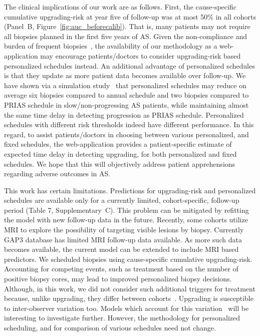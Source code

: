 The clinical implications of our work are as follows. First, the cause-specific cumulative upgrading-risk at year five of follow-up was at most 50\% in all cohorts (Panel~B, Figure~\ref{fig:auc_beforecalib}). That is, many patients may not require all biopsies planned in the first five years of AS. Given the non-compliance and burden of frequent biopsies~\citep{bokhorst2015compliance}, the availability of our methodology as a web-application may encourage patients/doctors to consider upgrading-risk based personalized schedules instead. An additional advantage of personalized schedules is that they update as more patient data becomes available over follow-up. We have shown via a simulation study~\citep{tomer2019personalized} that personalized schedules may reduce on average six biopsies compared to annual schedule and two biopsies compared to PRIAS schedule in slow/non-progressing AS patients, while maintaining almost the same time delay in detecting progression as PRIAS schedule. Personalized schedules with different risk thresholds indeed have different performance. In this regard, to assist patients/doctors in choosing between various personalized, and fixed schedules, the web-application provides a patient-specific estimate of expected time delay in detecting upgrading, for both personalized and fixed schedules. We hope that this will objectively address patient apprehensions regarding adverse outcomes in AS.

This work has certain limitations. Predictions for upgrading-risk and personalized schedules are available only for a currently limited, cohort-specific, follow-up period (Table 7, Supplementary~C). This problem can be mitigated by refitting the model with new follow-up data in the future. Recently, some cohorts utilize MRI to explore the possibility of targeting visible lesions by biopsy. Currently GAP3 database has limited MRI follow-up data available. As more such data becomes available, the current model can be extended to include MRI based predictors. We scheduled biopsies using cause-specific cumulative upgrading-risk. Accounting for competing events, such as treatment based on the number of positive biopsy cores, may lead to improved personalized biopsy decisions. Although, in this work, we did not consider such additional triggers for treatment because, unlike upgrading, they differ between cohorts~\citep{nieboer2018active}. Upgrading is susceptible to inter-observer variation too. Models which account for this variation~\citep{coley2017prediction,balasubramanian2003estimation} will be interesting to investigate further. However, the methodology for personalized scheduling, and for comparison of various schedules need not change.